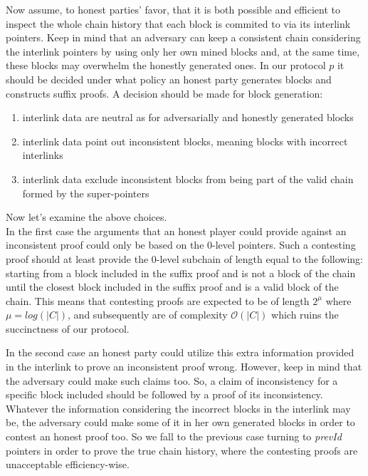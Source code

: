 Now assume, to honest parties' favor, that it is both possible and efficient to inspect the whole chain history that each block is commited to via its interlink pointers. Keep in mind that an adversary can keep a consistent chain considering the interlink pointers by using only her own mined blocks and, at the same time, these blocks may overwhelm the honestly generated ones. In our protocol $p$ it should be decided  under what policy an honest party generates blocks and constructs suffix proofs. A decision should be made for block generation:
\begin{enumerate}
\item interlink data are neutral as for adversarially and honestly generated blocks
\item interlink data point out inconsistent blocks, meaning blocks with incorrect interlinks
\item interlink data exclude inconsistent blocks from being part of the valid chain formed by the super-pointers
\end{enumerate}
Now let's examine the above choices. \\
In the first case the arguments that an honest player could provide against an inconsistent proof could only be based on the 0-level pointers. Such a contesting proof should at least provide the 0-level subchain of length equal to the following: starting from a block included in the suffix proof and is not a block of the chain until the closest block included in the suffix proof and is a valid block of the chain. This means that contesting proofs are expected to be of length $2^\mu$ where $\mu = log(|C|)$, and subsequently are of complexity $\mathcal{O}(|C|)$ which ruins the succinctness of our protocol.

In the second case an honest party could utilize this extra information provided in the interlink to prove an inconsistent proof wrong. However, keep in mind that the adversary could make such claims too. So, a claim of inconsistency for a specific block included should be followed by a proof of its inconsistency. Whatever the information considering the incorrect blocks in the interlink may be, the adversary could make some of it in her own generated blocks in order to contest an honest proof too. So we fall to the previous case turning to \textit{prevId} pointers in order to prove the true chain history, where the contesting proofs are unacceptable efficiency-wise.

